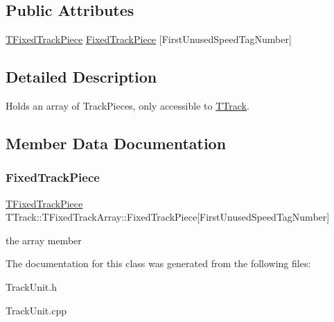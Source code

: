 \subsection*{Public Attributes}
\begin{DoxyCompactItemize}
\item 
\mbox{\hyperlink{class_t_fixed_track_piece}{T\+Fixed\+Track\+Piece}} \mbox{\hyperlink{class_t_track_1_1_t_fixed_track_array_a32c84d732dc1990a3ba33f10a4602c8a}{Fixed\+Track\+Piece}} \mbox{[}First\+Unused\+Speed\+Tag\+Number\mbox{]}
\end{DoxyCompactItemize}


\subsection{Detailed Description}
Holds an array of Track\+Pieces, only accessible to \mbox{\hyperlink{class_t_track}{T\+Track}}. 

\subsection{Member Data Documentation}
\mbox{\label{class_t_track_1_1_t_fixed_track_array_a32c84d732dc1990a3ba33f10a4602c8a}} 
\subsubsection{\texorpdfstring{Fixed\+Track\+Piece}{FixedTrackPiece}}
{\footnotesize\ttfamily \mbox{\hyperlink{class_t_fixed_track_piece}{T\+Fixed\+Track\+Piece}} T\+Track\+::\+T\+Fixed\+Track\+Array\+::\+Fixed\+Track\+Piece\mbox{[}First\+Unused\+Speed\+Tag\+Number\mbox{]}}

the array member 

The documentation for this class was generated from the following files\+:\begin{DoxyCompactItemize}
\item 
Track\+Unit.\+h\item 
Track\+Unit.\+cpp\end{DoxyCompactItemize}
